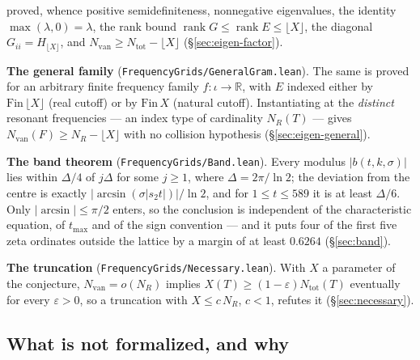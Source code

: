 \documentclass[11pt,a4paper]{article}
\newcommand{\R}{\mathbb{R}}
\newcommand{\code}[1]{\texttt{#1}}
\theoremstyle{definition}
\theoremstyle{remark}
\begin{document}
{  proved, whence positive semidefiniteness, nonnegative eigenvalues, the identity
  $\max(\lambda,0)=\lambda$, the rank bound $\operatorname{rank}G\le\operatorname{rank}E\le
  \lfloor X\rfloor$, the diagonal $G_{ii}=H_{\lfloor X\rfloor}$, and
  $N_{\mathrm{van}}\ge N_{\mathrm{tot}}-\lfloor X\rfloor$ (\S\ref{sec:eigen-factor}).
\item \textbf{The general family} (\code{FrequencyGrids/GeneralGram.lean}). The same is proved
  for an arbitrary finite frequency family $f:\iota\to\R$, with $E$ indexed either by
  $\mathrm{Fin}\,\lfloor X\rfloor$ (real cutoff) or by $\mathrm{Fin}\,X$ (natural cutoff).
  Instantiating at the \emph{distinct} resonant frequencies --- an index type of cardinality
  $N_R(T)$ --- gives $N_{\mathrm{van}}(F)\ge N_R-\lfloor X\rfloor$ with no collision
  hypothesis (\S\ref{sec:eigen-general}).
\item \textbf{The band theorem} (\code{FrequencyGrids/Band.lean}). Every modulus
  $|b(t,k,\sigma)|$ lies within $\Delta/4$ of $j\Delta$ for some $j \ge 1$, where
  $\Delta = 2\pi/\ln 2$; the deviation from the centre is exactly
  $|\arcsin(\sigma|s_2 t|)|/\ln 2$, and for $1 \le t \le 589$ it is at least $\Delta/6$. Only
  $|\arcsin| \le \pi/2$ enters, so the conclusion is independent of the characteristic equation,
  of $t_{\max}$ and of the sign convention --- and it puts four of the first five zeta ordinates
  outside the lattice by a margin of at least $0.6264$ (\S\ref{sec:band}).
\item \textbf{The truncation} (\code{FrequencyGrids/Necessary.lean}). With $X$ a parameter of
  the conjecture, $N_{\mathrm{van}}=o(N_R)$ implies $X(T)\ge(1-\varepsilon)N_{\mathrm{tot}}(T)$
  eventually for every $\varepsilon>0$, so a truncation with $X\le c\,N_R$, $c<1$, refutes it
  (\S\ref{sec:necessary}).
}

\subsection*{What is not formalized, and why}
\end{document}

